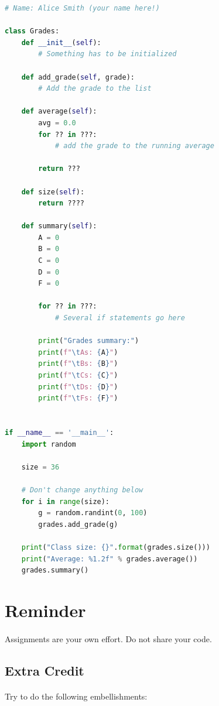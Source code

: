 \documentclass[letter,10pt]{article}
\begin{document}
    \begin{lstlisting}[language=python]
# Name: Alice Smith (your name here!)
        
class Grades:
    def __init__(self):
        # Something has to be initialized
    
    def add_grade(self, grade):
        # Add the grade to the list
    
    def average(self):
        avg = 0.0
        for ?? in ???:
            # add the grade to the running average
    
        return ???
    
    def size(self):
        return ????
    
    def summary(self):
        A = 0
        B = 0
        C = 0
        D = 0
        F = 0
    
        for ?? in ???:
            # Several if statements go here
    
        print("Grades summary:")
        print(f"\tAs: {A}")
        print(f"\tBs: {B}")
        print(f"\tCs: {C}")
        print(f"\tDs: {D}")
        print(f"\tFs: {F}")
    
    
if __name__ == '__main__':
    import random
    
    size = 36
    
    # Don't change anything below
    for i in range(size):
        g = random.randint(0, 100)
        grades.add_grade(g)
    
    print("Class size: {}".format(grades.size()))
    print("Average: %1.2f" % grades.average())
    grades.summary()
    \end{lstlisting}
    
    \section*{Reminder}
    \paragraph{}Assignments are your own effort. Do not share your code.
    
    \subsection*{Extra Credit}
    \paragraph{}Try to do the following embellishments:
    
\end{document}
